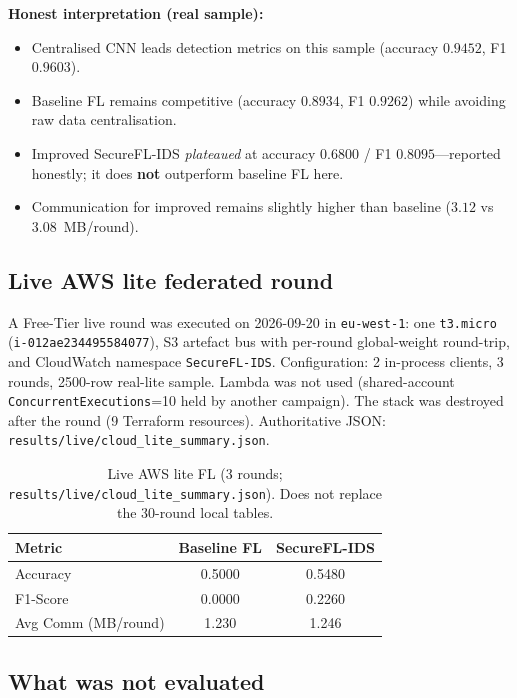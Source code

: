 \textbf{Honest interpretation (real sample):}

\begin{itemize}
    \item Centralised CNN leads detection metrics on this sample (accuracy $0.9452$, F1 $0.9603$).
    \item Baseline FL remains competitive (accuracy $0.8934$, F1 $0.9262$) while avoiding raw data centralisation.
    \item Improved SecureFL-IDS \emph{plateaued} at accuracy $0.6800$ / F1 $0.8095$---reported honestly; it does \textbf{not} outperform baseline FL here.
    \item Communication for improved remains slightly higher than baseline ($3.12$ vs $3.08$~MB/round).
\end{itemize}

\subsection{Live AWS lite federated round}

A Free-Tier live round was executed on 2026-09-20 in \texttt{eu-west-1}: one \texttt{t3.micro} (\texttt{i-012ae234495584077}), S3 artefact bus with per-round global-weight round-trip, and CloudWatch namespace \texttt{SecureFL-IDS}. Configuration: 2 in-process clients, 3 rounds, 2500-row real-lite sample. Lambda was not used (shared-account \texttt{ConcurrentExecutions}=10 held by another campaign). The stack was destroyed after the round (9 Terraform resources). Authoritative JSON: \texttt{results/live/cloud\_lite\_summary.json}.

\begin{table}[h]
\centering
\begin{tabular}{lcc}
\toprule
\textbf{Metric} & \textbf{Baseline FL} & \textbf{SecureFL-IDS} \\
\midrule
Accuracy & 0.5000 & 0.5480 \\
F1-Score & 0.0000 & 0.2260 \\
Avg Comm (MB/round) & 1.230 & 1.246 \\
\bottomrule
\end{tabular}
\caption{Live AWS lite FL (3 rounds; \texttt{results/live/cloud\_lite\_summary.json}). Does not replace the 30-round local tables.}
\label{tab:live_cloud_fl}
\end{table}

\subsection{What was not evaluated}


